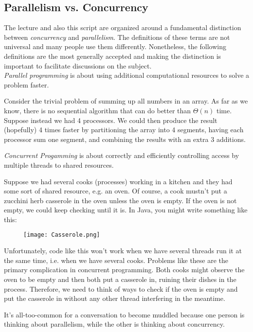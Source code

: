 \documentclass[main]{subfiles}
\begin{document}
\subsection{Parallelism vs. Concurrency}
The lecture and also this script are organized around a fundamental distinction between \textit{concurrency} and \textit{parallelism}. The definitions of these terms are not universal and many people use them differently. Nonetheless, the following definitions are the most generally accepted and making the distinction is important to facilitate discussions on the subject.\\[3mm]
\textit{Parallel programming} is about using additional computational resources to solve a problem faster. 
\begin{example}
    Consider the trivial problem of summing up all numbers in an array. As far as we know, there is no sequential algorithm that can do better than $\Theta(n)$ time. Suppose instead we had 4 processors. We could then produce the result (hopefully) 4 times faster by partitioning the array into 4 segments, having each processor sum one segment, and combining the results with an extra 3 additions.
\end{example}
\textit{Concurrent Progamming} is about correctly and efficiently controlling access by multiple threads to shared resources.
\begin{example}
    Suppose we had several cooks (processes) working in a kitchen and they had some sort of shared resource, e.g. an oven. Of course, a cook mustn't put a zucchini herb casserole in the oven unless the oven is empty. If the oven is not empty, we could keep checking until it is. In Java, you might write something like this: 
    \begin{figure}[H]
        \centering
        \texttt{[image: Casserole.png]}
    \end{figure}
    Unfortunately, code like this won't work when we have several threads run it at the same time, i.e. when we have several cooks. Problems like these are the primary complication in concurrent programming. Both cooks might observe the oven to be empty and then both put a casserole in, ruining their dishes in the process. Therefore, we need to think of ways to check if the oven is empty and put the casserole in without any other thread interfering in the meantime.
\end{example}
It's all-too-common for a conversation to become muddled because one person is thinking about parallelism, while the other is thinking about concurrency.\\[3mm]
\end{document}
